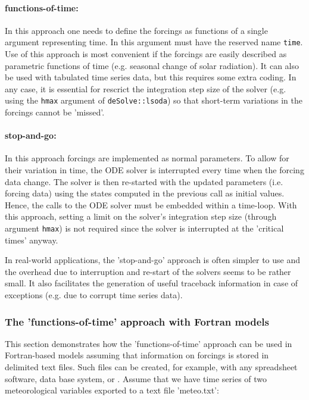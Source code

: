 \documentclass[times,onecolumn]{article}
\begin{document}
\paragraph{functions-of-time:} In this approach one needs to define the forcings as functions of a single argument representing time. In  this argument must have the reserved name \verb|time|. Use of this approach is most convenient if the forcings are easily described as parametric functions of time (e.g. seasonal change of solar radiation). It can also be used with tabulated time series data, but this requires some extra coding. In any case, it is essential for rescrict the integration step size of the solver (e.g. using the \verb|hmax| argument of \verb|deSolve::lsoda|) so that short-term variations in the forcings cannot be 'missed'.
 
\paragraph{stop-and-go:} In this approach forcings are implemented as normal parameters. To allow for their variation in time, the ODE solver is interrupted every time when the forcing data change. The solver is then re-started with the updated parameters (i.e. forcing data) using the states computed in the previous call as initial values. Hence, the calls to the ODE solver must be embedded within a time-loop. With this approach, setting a limit on the solver's integration step size (through argument \verb|hmax|) is not required since the solver is interrupted at the 'critical times' anyway.

In real-world applications, the 'stop-and-go' approach is often simpler to use and the overhead due to interruption and re-start of the solvers seems to be rather small. It also facilitates the generation of useful traceback information in case of exceptions (e.g. due to corrupt time series data).

\subsubsection{The 'functions-of-time' approach with Fortran models}

This section demonstrates how the 'functions-of-time' approach can be used in Fortran-based models assuming that information on forcings is stored in delimited text files. Such files can be created, for example, with any spreadsheet software, data base system, or . Assume that we have time series of two meteorological variables exported to a text file 'meteo.txt':
\end{document}

